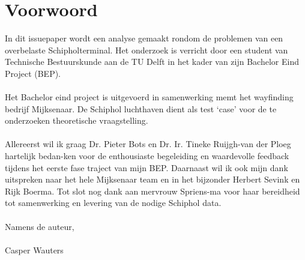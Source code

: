 \chapter*{Voorwoord}

In dit issuepaper wordt een analyse gemaakt rondom de problemen van een overbelaste Schipholterminal. Het onderzoek is verricht door een student van Technische Bestuurskunde aan de TU Delft in het kader van zijn Bachelor Eind Project (BEP). 
\\ \\
Het Bachelor eind project is uitgevoerd in samenwerking memt het wayfinding bedrijf Mijksenaar. De Schiphol luchthaven dient als test ‘case’ voor de te onderzoeken theoretische vraagstelling.
\\ \\ 
Allereerst wil ik graag Dr. Pieter Bots en Dr. Ir. Tineke Ruijgh-van der Ploeg hartelijk bedan-ken voor de enthousiaste begeleiding en waardevolle feedback tijdens het eerste fase traject van mijn BEP. Daarnaast wil ik ook mijn dank uitspreken naar het hele Mijksenaar team en in het bijzonder Herbert Sevink en Rijk Boerma. Tot slot nog dank aan mervrouw Spriens-ma voor haar bereidheid tot samenwerking en levering van de nodige Schiphol data.
\\ \\
Namens de auteur,
\\ \\
Casper Wauters




